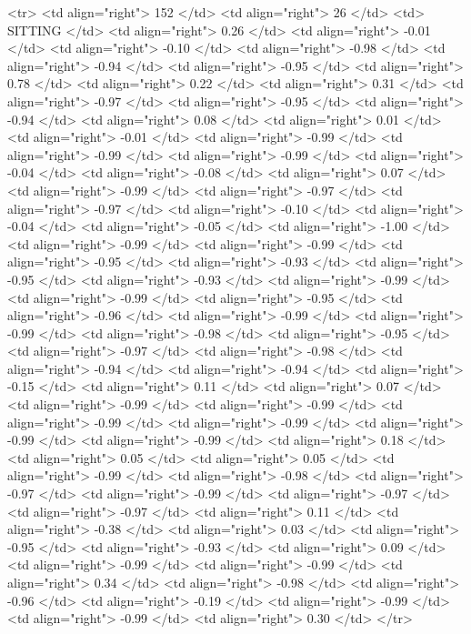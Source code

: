   <tr> <td align="right"> 152 </td> <td align="right">  26 </td> <td> SITTING </td> <td align="right"> 0.26 </td> <td align="right"> -0.01 </td> <td align="right"> -0.10 </td> <td align="right"> -0.98 </td> <td align="right"> -0.94 </td> <td align="right"> -0.95 </td> <td align="right"> 0.78 </td> <td align="right"> 0.22 </td> <td align="right"> 0.31 </td> <td align="right"> -0.97 </td> <td align="right"> -0.95 </td> <td align="right"> -0.94 </td> <td align="right"> 0.08 </td> <td align="right"> 0.01 </td> <td align="right"> -0.01 </td> <td align="right"> -0.99 </td> <td align="right"> -0.99 </td> <td align="right"> -0.99 </td> <td align="right"> -0.04 </td> <td align="right"> -0.08 </td> <td align="right"> 0.07 </td> <td align="right"> -0.99 </td> <td align="right"> -0.97 </td> <td align="right"> -0.97 </td> <td align="right"> -0.10 </td> <td align="right"> -0.04 </td> <td align="right"> -0.05 </td> <td align="right"> -1.00 </td> <td align="right"> -0.99 </td> <td align="right"> -0.99 </td> <td align="right"> -0.95 </td> <td align="right"> -0.93 </td> <td align="right"> -0.95 </td> <td align="right"> -0.93 </td> <td align="right"> -0.99 </td> <td align="right"> -0.99 </td> <td align="right"> -0.95 </td> <td align="right"> -0.96 </td> <td align="right"> -0.99 </td> <td align="right"> -0.99 </td> <td align="right"> -0.98 </td> <td align="right"> -0.95 </td> <td align="right"> -0.97 </td> <td align="right"> -0.98 </td> <td align="right"> -0.94 </td> <td align="right"> -0.94 </td> <td align="right"> -0.15 </td> <td align="right"> 0.11 </td> <td align="right"> 0.07 </td> <td align="right"> -0.99 </td> <td align="right"> -0.99 </td> <td align="right"> -0.99 </td> <td align="right"> -0.99 </td> <td align="right"> -0.99 </td> <td align="right"> -0.99 </td> <td align="right"> 0.18 </td> <td align="right"> 0.05 </td> <td align="right"> 0.05 </td> <td align="right"> -0.99 </td> <td align="right"> -0.98 </td> <td align="right"> -0.97 </td> <td align="right"> -0.99 </td> <td align="right"> -0.97 </td> <td align="right"> -0.97 </td> <td align="right"> 0.11 </td> <td align="right"> -0.38 </td> <td align="right"> 0.03 </td> <td align="right"> -0.95 </td> <td align="right"> -0.93 </td> <td align="right"> 0.09 </td> <td align="right"> -0.99 </td> <td align="right"> -0.99 </td> <td align="right"> 0.34 </td> <td align="right"> -0.98 </td> <td align="right"> -0.96 </td> <td align="right"> -0.19 </td> <td align="right"> -0.99 </td> <td align="right"> -0.99 </td> <td align="right"> 0.30 </td> </tr>
